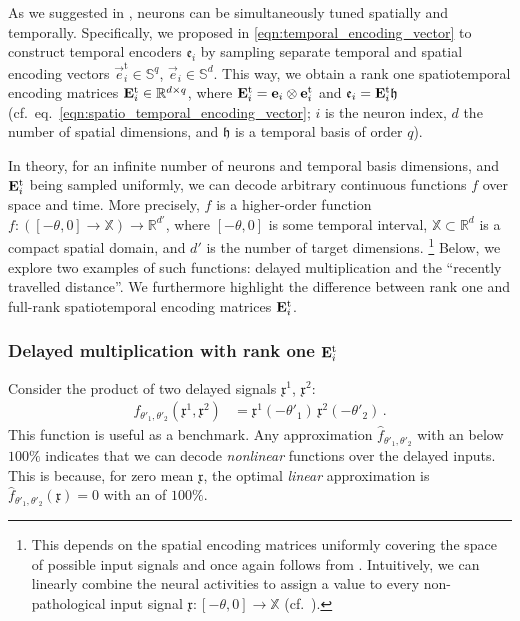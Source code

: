 As we suggested in , neurons can be simultaneously tuned spatially and temporally.
Specifically, we proposed in \cref{eqn:temporal_encoding_vector} to construct temporal encoders $\mathfrak{e}_i$ by sampling separate temporal and spatial encoding vectors $\vec e^\mathrm{t}_i \in \mathbb{S}^q$, $\vec e_i \in \mathbb{S}^d$.
This way, we obtain a rank one spatiotemporal encoding matrices $\mathbf{E}_i^\mathrm{t} \in \mathbb{R}^{d \times q}$, where $\mathbf{E}_i^\mathrm{t} = \mathbf{e}_i \otimes \mathbf{e}^\mathrm{t}_i$ and $\mathfrak{e}_i = \mathbf{E}_i^\mathrm{t} \mathfrak{h}$ (cf.~eq.~\ref{eqn:spatio_temporal_encoding_vector}; $i$ is the neuron index, $d$ the number of spatial dimensions, and $\mathfrak{h}$ is a temporal basis of order $q$).

In theory, for an infinite number of neurons and temporal basis dimensions, and $\mathbf{E}_i^\mathrm{t}$ being sampled uniformly, we can decode arbitrary continuous functions $f$ over space and time.
More precisely, $f$ is a higher-order function $f : ([-\theta, 0] \longrightarrow \mathbb{X}) \longrightarrow \mathbb{R}^{d'}$, where $[-\theta, 0]$ is some temporal interval, $\mathbb{X} \subset \mathbb{R}^d$ is a compact spatial domain, and $d'$ is the number of target dimensions.%
\footnote{
This depends on the spatial encoding matrices uniformly covering the space of possible input signals and once again follows from \citet{hornik1989multilayer}.
Intuitively, we can linearly combine the neural activities to assign a value to every non-pathological input signal $\mathfrak{x} : [-\theta, 0] \longrightarrow \mathbb{X}$ (cf.~).}
Below, we explore two examples of such functions: delayed multiplication and the \enquote{recently travelled distance}.
We furthermore highlight the difference between rank one and full-rank spatiotemporal encoding matrices $\mathbf{E}_i^\mathrm{t}$.

\subsubsection{Delayed multiplication with rank one $\mathbf{E}_i^\mathrm{t}$}
Consider the product of two delayed signals $\mathfrak{x}^1$, $\mathfrak{x}^2$:
\begin{align*}
	f_{\theta'_1, \theta'_2}(\mathfrak{x}^1, \mathfrak{x}^2) &= \mathfrak{x}^1 (- \theta'_1) \, \mathfrak{x}^2 (- \theta'_2) \,.
\end{align*}
This function is useful as a benchmark.
Any approximation $\hat f_{\theta'_1, \theta'_2}$ with an \NRMSE below $100\%$ indicates that we can decode \emph{nonlinear} functions over the delayed inputs.
This is because, for zero mean $\mathfrak{x}$, the optimal \emph{linear} approximation is $\hat f_{\theta'_1, \theta'_2}(\mathfrak{x}) = 0$ with an \NRMSE of $100\%$.

